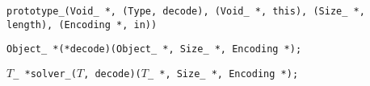
\tt{prototype_(Void_ *, (Type, decode), (Void_ *, this), (Size_ *, length), (Encoding *, in))}


\tt{Object_ *(*decode)(Object_ *, Size_ *, Encoding *);}


$T$\tt{_ *solver_(}$T$\tt{, decode)(}$T$\tt{_ *, Size_ *, Encoding *);}
